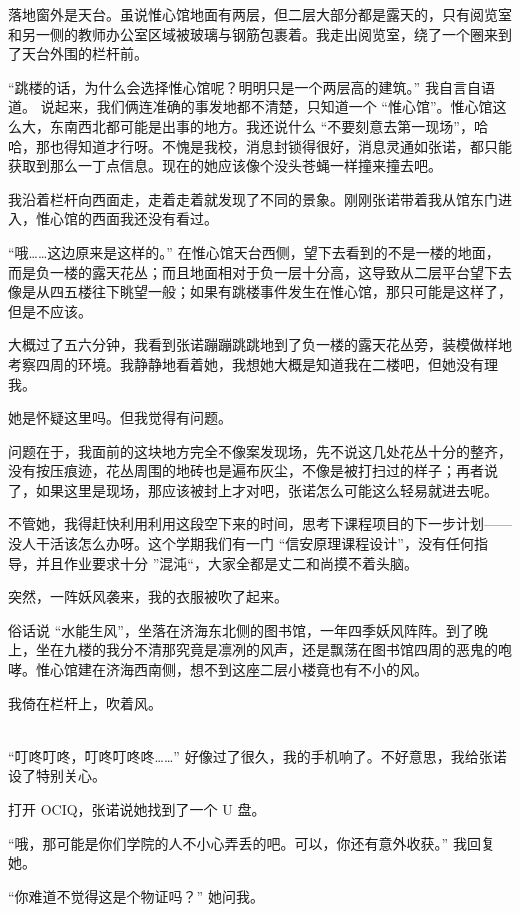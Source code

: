 \documentclass[UTF8]{ctexart}
\begin{document}
落地窗外是天台。虽说惟心馆地面有两层，但二层大部分都是露天的，只有阅览室和另一侧的教师办公室区域被玻璃与钢筋包裹着。我走出阅览室，绕了一个圈来到了天台外围的栏杆前。

“跳楼的话，为什么会选择惟心馆呢？明明只是一个两层高的建筑。” 我自言自语道。
说起来，我们俩连准确的事发地都不清楚，只知道一个 “惟心馆”。惟心馆这么大，东南西北都可能是出事的地方。我还说什么 “不要刻意去第一现场”，哈哈，那也得知道才行呀。不愧是我校，消息封锁得很好，消息灵通如张诺，都只能获取到那么一丁点信息。现在的她应该像个没头苍蝇一样撞来撞去吧。

我沿着栏杆向西面走，走着走着就发现了不同的景象。刚刚张诺带着我从馆东门进入，惟心馆的西面我还没有看过。

“哦……这边原来是这样的。” 在惟心馆天台西侧，望下去看到的不是一楼的地面，而是负一楼的露天花丛；而且地面相对于负一层十分高，这导致从二层平台望下去像是从四五楼往下眺望一般；如果有跳楼事件发生在惟心馆，那只可能是这样了，但是不应该。

大概过了五六分钟，我看到张诺蹦蹦跳跳地到了负一楼的露天花丛旁，装模做样地考察四周的环境。我静静地看着她，我想她大概是知道我在二楼吧，但她没有理我。

她是怀疑这里吗。但我觉得有问题。

问题在于，我面前的这块地方完全不像案发现场，先不说这几处花丛十分的整齐，没有按压痕迹，花丛周围的地砖也是遍布灰尘，不像是被打扫过的样子；再者说了，如果这里是现场，那应该被封上才对吧，张诺怎么可能这么轻易就进去呢。

不管她，我得赶快利用利用这段空下来的时间，思考下课程项目的下一步计划——没人干活该怎么办呀。这个学期我们有一门 “信安原理课程设计”，没有任何指导，并且作业要求十分 ”混沌“，大家全都是丈二和尚摸不着头脑。

突然，一阵妖风袭来，我的衣服被吹了起来。

俗话说 “水能生风”，坐落在济海东北侧的图书馆，一年四季妖风阵阵。到了晚上，坐在九楼的我分不清那究竟是凛冽的风声，还是飘荡在图书馆四周的恶鬼的咆哮。惟心馆建在济海西南侧，想不到这座二层小楼竟也有不小的风。

我倚在栏杆上，吹着风。

~\\

“叮咚叮咚，叮咚叮咚咚……” 好像过了很久，我的手机响了。不好意思，我给张诺设了特别关心。

打开 OCIQ，张诺说她找到了一个 U 盘。

“哦，那可能是你们学院的人不小心弄丢的吧。可以，你还有意外收获。” 我回复她。

“你难道不觉得这是个物证吗？” 她问我。
\end{document}
